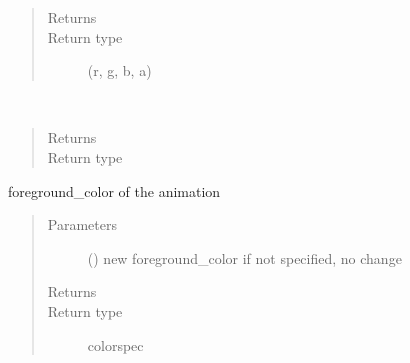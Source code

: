 \documentclass[letterpaper,10pt,english]{sphinxmanual}
\begin{document}
\begin{fulllineitems}
\begin{fulllineitems}
\begin{quote}
\begin{description}
\item[{Returns}] \leavevmode


\item[{Return type}] \leavevmode
(r, g, b, a)

\end{description}\end{quote}

\end{fulllineitems}


\begin{fulllineitems}
\label{\detokenize{Reference:salabim.Environment.current_component}}~\begin{quote}\begin{description}
\item[{Returns}] \leavevmode
{}

\item[{Return type}] \leavevmode
{\hyperref[\detokenize{Reference:salabim.Component}]{}}

\end{description}\end{quote}

\end{fulllineitems}


\begin{fulllineitems}
\label{\detokenize{Reference:salabim.Environment.foreground_color}}
foreground\_color of the animation
\begin{quote}\begin{description}
\item[{Parameters}] \leavevmode
{} () \textendash{} new foreground\_color 
if not specified, no change

\item[{Returns}] \leavevmode
{}

\item[{Return type}] \leavevmode
colorspec

\end{description}\end{quote}


\end{fulllineitems}
\end{fulllineitems}
\end{document}
